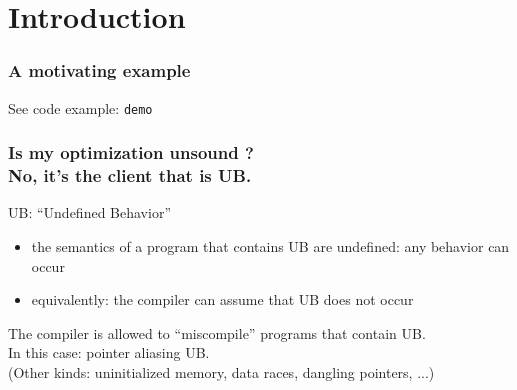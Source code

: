 \begin{frame}
    \titlepage
\end{frame}

\section{Introduction}


\begin{frame}[fragile,t]
    \frametitle{A motivating example}
    See code example: \texttt{demo}
\end{frame}

\begin{frame}
    \frametitle{Is my optimization unsound ?\\No, it's the client that is UB.}
    UB: ``Undefined Behavior''
    \begin{itemize}
        \item the semantics of a program that contains UB are undefined: any behavior can occur
        \item equivalently: the compiler can assume that UB does not occur
    \end{itemize}
    The compiler is allowed to ``miscompile'' programs that contain UB.\\

    In this case: pointer aliasing UB.\\
    (Other kinds: uninitialized memory, data races, dangling pointers, ...)
\end{frame}

